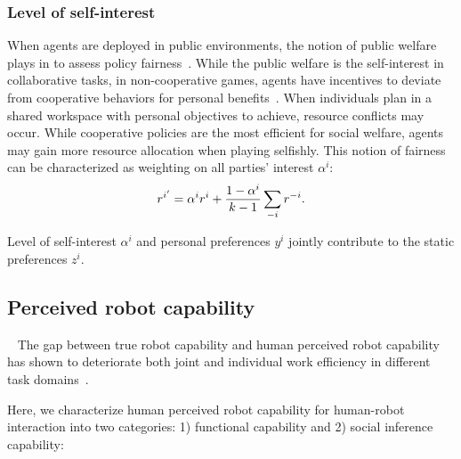 \documentclass[letterpaper, 10 pt, conference]{ieeeconf}  %
\begin{document}
\subsubsection{Level of self-interest}
When agents are deployed in public environments, the notion of public welfare 
plays in to assess policy fairness~\cite{fehr2004social}. While the public welfare is the 
self-interest in collaborative tasks, in non-cooperative games, agents have incentives to 
deviate from cooperative behaviors for personal benefits~\cite{fujiwara2015non}.  
When individuals plan in a shared workspace with personal objectives to 
achieve, resource conflicts may occur. 
While cooperative policies are the most efficient for social welfare, agents 
may gain more resource allocation when playing selfishly. 
This notion of fairness can be characterized as weighting on all 
parties' interest $\alpha^i$:
\begin{equation}
  r^{i'} = \alpha^ir^i+ \small{\frac{1-\alpha^i}{k-1}}\sum_{-i} r^{-i}.
\end{equation}

Level of self-interest $\alpha^i$ and personal preferences $y^i$ jointly contribute to the 
static preferences $z^i$.
\vspace{-.3em}
\subsection{Perceived robot capability}~\label{sec:perceived}
\vspace{-.2em}
The gap between true robot capability and human perceived robot capability  
has shown to deteriorate both joint and individual work efficiency in 
different task domains~\cite{dragan2015effects}. 

Here, we characterize human perceived robot capability for human-robot interaction into two categories: 1) functional capability and 2) social inference capability:
\end{document}
